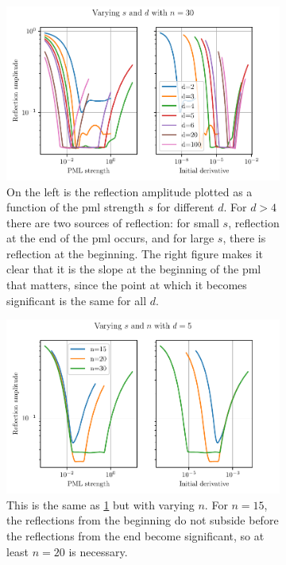 \begin{figure}[htpb]
	\centering
	\begin{subfigure}[]{0.99\textwidth}
	\begin{center}
		\includegraphics{chapters/results/pml_sweep_sd.pdf}
	\end{center}
	\caption{
		On the left is the reflection amplitude plotted as a function of the
		\gls{pml} strength $s$ for different $d$.
		For $d > 4$ there are two sources of reflection:
		for small $s$, reflection at the end of the \gls{pml} occurs,
		and for large $s$, there is reflection at the beginning.
		The right figure makes it clear that it is the slope at the beginning of
		the \gls{pml} that matters, since the point at which it becomes
		significant is the same for all $d$.
	}
	\label{fig:pml_sweep_sd}
	\end{subfigure}%

	\begin{subfigure}[]{0.99\textwidth}
	\begin{center}
		\includegraphics{chapters/results/pml_sweep_sn.pdf}
	\end{center}
	\caption{
		This is the same as \cref{fig:pml_sweep_sd} but with varying $n$.
		For $n=15$, the reflections from the beginning do not subside before the
		reflections from the end become significant, so at least $n=20$ is
		necessary.
	}
	\label{fig:pml_sweep_sn}
	\end{subfigure}
	\caption{}
	\label{fig:pml_sweep1}
\end{figure}

